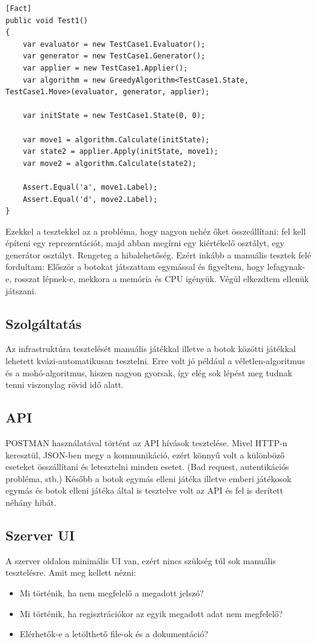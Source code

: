 \documentclass[twoside, a4paper, 12pt]{book}
\begin{document}
\begin{lstlisting}[caption=Mohó-algoritmus teszt, label=lst:greedy_test, float]
[Fact]
public void Test1()
{
	var evaluator = new TestCase1.Evaluator();
	var generator = new TestCase1.Generator();
	var applier = new TestCase1.Applier();
	var algorithm = new GreedyAlgorithm<TestCase1.State, TestCase1.Move>(evaluator, generator, applier);
	
	var initState = new TestCase1.State(0, 0);
	
	var move1 = algorithm.Calculate(initState);
	var state2 = applier.Apply(initState, move1);
	var move2 = algorithm.Calculate(state2);
	
	Assert.Equal('a', move1.Label);
	Assert.Equal('d', move2.Label);
}
\end{lstlisting}

Ezekkel a tesztekkel az a probléma, hogy nagyon nehéz őket összeállítani: fel kell építeni egy reprezentációt, majd abban megírni egy kiértékelő osztályt, egy generátor osztályt. Rengeteg a hibalehetőség. Ezért inkább a manuális tesztek felé fordultam:
Először a botokat játszattam egymással és figyeltem, hogy lefagynak-e, rosszat lépnek-e, mekkora a memória és CPU igényük. Végül elkezdtem ellenük játszani.

\subsection{Szolgáltatás}
Az infrastruktúra tesztelését manuális játékkal illetve a botok közötti játékkal lehetett kvázi-automatikusan tesztelni. Erre volt jó például a véletlen-algoritmus és a mohó-algoritmus, hiszen nagyon gyorsak, így elég sok lépést meg tudnak tenni viszonylag rövid idő alatt.

\subsection{API}
POSTMAN használatával történt az API hívások tesztelése. Mivel HTTP-n keresztül, JSON-ben megy a kommunikáció, ezért könnyű volt a különböző eseteket összállítani és letesztelni minden esetet. (Bad request, autentikációs probléma, stb.) Később a botok egymás elleni játéka illetve emberi játékosok egymás és botok elleni játéka által is tesztelve volt az API és fel is derített néhány hibát.

\subsection{Szerver UI}
A szerver oldalon minimális UI van, ezért nincs szükség túl sok manuális tesztelésre. Amit meg kellett nézni:
\begin{itemize}
	\item Mi történik, ha nem megfelelő a megadott jelszó?
	\item Mi történik, ha regisztrációkor az egyik megadott adat nem megfelelő?
	\item Elérhetők-e a letölthető file-ok és a dokumentáció?
\end{itemize}
\end{document}
